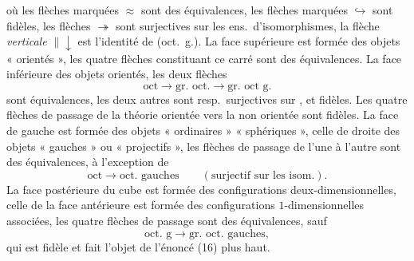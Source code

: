 \documentclass[11pt,a4paper]{article}
\begin{document}

où les flèches marquées $\approx$ sont des équivalences, les flèches marquées $\hookrightarrow$ sont \struck{\ill{}} fidèles, les flèches $\twoheadrightarrow$ sont \struck{\ill{}} surjectives sur les ens.\ d'isomorphismes, la flèche \emph{verticale} $\|\!\downarrow$ est l'identité de (oct.\ g.). La face supérieure est formée des objets « orientés », les quatre flèches constituant ce carré sont des équivalences. La face inférieure \struck{\ill{}}  des objets  orientés, \struck{\ill{}} les deux flèches
\[
\text{oct} \longrightarrow \text{gr.\ oct.} \longrightarrow \text{gr.\ oct g.}
\]
sont   équivalences, les deux autres sont resp.\ surjectives sur  , et fidèles. Les quatre flèches de passage de la théorie orientée vers la non orientée sont fidèles. La face de gauche est formée des objets « ordinaires » \struck{\ill{}} « sphériques », celle de droite des objets « gauches » ou « projectifs », les  flèches de passage de l'une à l'autre sont des équivalences, à l'exception de
\[
\text{oct} \longrightarrow \text{oct.\ gauches} \qquad (\text{surjectif sur les isom.}).
\]
La face postérieure du cube est formée des configurations deux-dimensionnelles,  celle de la face antérieure est formée des configurations $1$-dimensionnelles associées, les quatre flèches de passage sont des équivalences, sauf
\[
\text{oct.\ g} \longrightarrow \text{gr.\ oct.\ gauches},
\]
qui est fidèle et fait l'objet de l'énoncé (16) plus haut.
\end{document}
